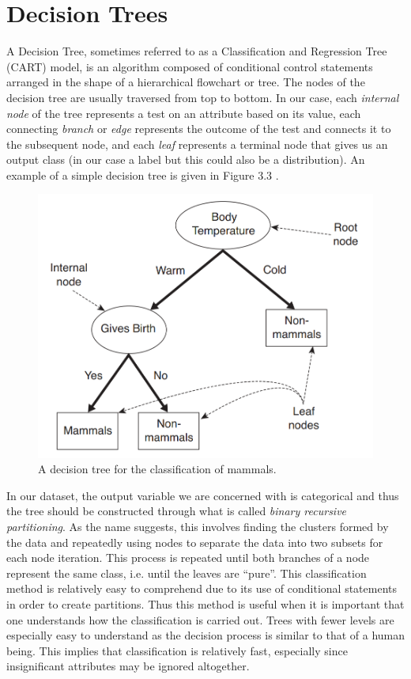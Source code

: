 \documentclass[a4paper, 12pt]{report}
\theoremstyle{definition}
\begin{document}
\section{Decision Trees}

A Decision Tree, sometimes referred to as a Classification and Regression Tree (CART) model, is an algorithm composed of conditional control statements arranged in the shape of a hierarchical flowchart or tree. The nodes of the decision tree are usually traversed from top to bottom. In our case, each \textit{internal node} of the tree represents a test on an attribute based on its value, each connecting \textit{branch} or \textit{edge} represents the outcome of the test and connects it to the subsequent node, and each \textit{leaf} represents a terminal node that gives us an output class (in our case a label but this could also be a distribution). An example of a simple decision tree is given in Figure 3.3 \autocite{introdatamining}.

\begin{figure}[h!]
  \centering
  \includegraphics[width=0.7\linewidth]{im/decisiontreeex.png}
  \caption{A decision tree for the classification of mammals.}
  \label{fig:DT1}
\end{figure}

In our dataset, the output variable we are concerned with is categorical and thus the tree should be constructed through what is called \textit{binary recursive partitioning}. As the name suggests, this involves finding the clusters formed by the data and repeatedly using nodes to separate the data into two subsets for each node iteration. This process is repeated until both branches of a node represent the same class, i.e. until the leaves are \enquote{pure}. This classification method is relatively easy to comprehend due to its use of conditional statements in order to create partitions. Thus this method is useful when it is important that one understands how the classification is carried out. Trees with fewer levels are especially easy to understand as the decision process is similar to that of a human being. This implies that classification is relatively fast, especially since insignificant attributes may be ignored altogether.
\end{document}
